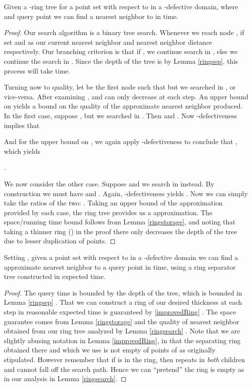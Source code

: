 \documentclass[11pt]{myclass}
\begin{document}
\begin{lemma}\label{ringsearch}
Given a -ring tree  for a point set with respect to  in a -defective domain, where  
and query point  we can find a  nearest neighbor to  in  time.
\end{lemma}
\begin{proof}
Our search algorithm is a binary tree search. Whenever we reach node , 
if  set  and  
as our current nearest neighbor and nearest neighbor distance respectively.
Our branching criterion is that if  ,
 we continue search in , else we continue the  search in .
 Since the depth of the tree is  by Lemma \ref{ringsep}, this process will take  time.

Turning now to quality, let  be the first node such that  but we 
searched in , or vice-versa.  After examining ,  and  can only decrease at each step.
 An upper bound on  yields a bound on the quality of the approximate nearest neighbor produced.
In the first case, suppose , but we searched in .
Then  and  .
Now -defectiveness implies that 

And for the upper bound on , we again apply -defectiveness to conclude that , which yields 

.


We now consider the other case. Suppose  and we search 
in  instead.  By construction we must have
  and .
Again, -defectiveness yields . Now we can simply take the ratios of the two:
. Taking an upper bound of the approximation provided by each case, the ring tree 
provides us a  approximation. The space/running time bound follows from Lemma \ref{ringstorage}, and noting that taking a thinner ring
()  in the proof there only decreases the depth of the tree due to lesser duplication of points.
\end{proof}


\begin{corollary}
Setting , given a point set with respect to  in a -defective domain we can find a  approximate nearest neighbor to a query point 
 in  time, using a  ring separator tree constructed in
  expected time.
\end{corollary}

\begin{proof}
 The query time is bounded by the depth of the tree, which is bounded in Lemma \ref{ringsep} . That we can construct
 a ring of our desired thickness at each step in reasonable expected time is guaranteed by \ref{improvedRing} . The space guarantee comes from Lemma \ref{ringstorage} and 
the quality of nearest neighbor obtained from our ring tree analyzed by Lemma \ref{ringsearch} .
Note that we are slightly abusing notation in Lemma \ref{improvedRing}, in that the separating ring
obtained there and which we use is not empty of points of  as originally stipulated. However remember that if  is in the ring, then  repeats in \emph{both} children 
and cannot fall off the search path. Hence we can ``pretend'' the ring is empty  as in our analysis in 
Lemma \ref{ringsearch}.
\end{proof}
\end{document}
